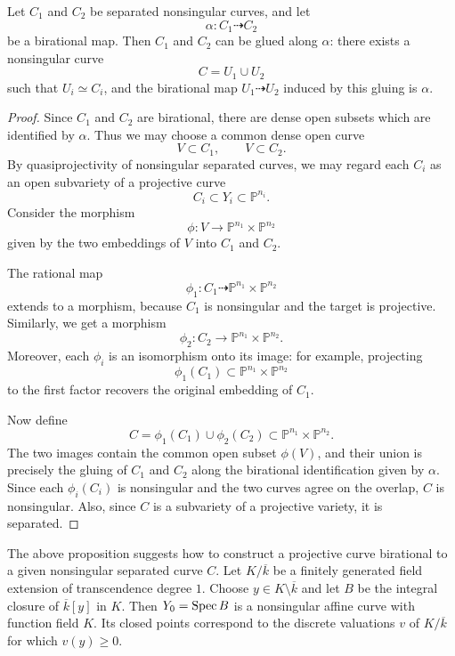 \documentclass[12pt]{article}
\begin{document}
\begin{proposition}
    Let $C_1$ and $C_2$ be separated nonsingular curves, and let
    \[
        \alpha:C_1\dashrightarrow C_2
    \]
    be a birational map. Then $C_1$ and $C_2$ can be glued along $\alpha$: there exists a nonsingular curve
    \[
        C=U_1\cup U_2
    \]
    such that $U_i\simeq C_i$, and the birational map $U_1\dashrightarrow U_2$ induced by this gluing is $\alpha$.
\end{proposition}

\begin{proof}
    Since $C_1$ and $C_2$ are birational, there are dense open subsets which are identified by $\alpha$. Thus we may choose a common dense open curve
    \[
        V\subset C_1,\qquad V\subset C_2.
    \]
    By quasiprojectivity of nonsingular separated curves, we may regard each $C_i$ as an open subvariety of a projective curve
    \[
        C_i\subset Y_i\subset \mathbb P^{n_i}.
    \]
    Consider the morphism
    \[
        \phi:V\to \mathbb P^{n_1}\times \mathbb P^{n_2}
    \]
    given by the two embeddings of $V$ into $C_1$ and $C_2$.

    The rational map
    \[
        \phi_1:C_1\dashrightarrow \mathbb P^{n_1}\times \mathbb P^{n_2}
    \]
    extends to a morphism, because $C_1$ is nonsingular and the target is projective. Similarly, we get a morphism
    \[
        \phi_2:C_2\to \mathbb P^{n_1}\times \mathbb P^{n_2}.
    \]
    Moreover, each $\phi_i$ is an isomorphism onto its image: for example, projecting
    \[
        \phi_1(C_1)\subset \mathbb P^{n_1}\times \mathbb P^{n_2}
    \]
    to the first factor recovers the original embedding of $C_1$.

    Now define
    \[
        C=\phi_1(C_1)\cup \phi_2(C_2)
        \subset \mathbb P^{n_1}\times \mathbb P^{n_2}.
    \]
    The two images contain the common open subset $\phi(V)$, and their union is precisely the gluing of $C_1$ and $C_2$ along the birational identification given by $\alpha$. Since each $\phi_i(C_i)$ is nonsingular and the two curves agree on the overlap, $C$ is nonsingular. Also, since $C$ is a subvariety of a projective variety, it is separated.
\end{proof}

The above proposition suggests how to construct a projective curve birational to a given nonsingular separated curve $C$. Let $K/\overline{k}$ be a finitely generated field extension of transcendence degree $1$. Choose $y\in K\setminus \overline{k}$ and let $B$ be the integral closure of $\overline{k}[y]$ in $K$. Then $Y_0=\operatorname{Spec} B$ is a nonsingular affine curve with function field $K$. Its closed points correspond to the discrete valuations $v$ of $K/\overline{k}$ for which $v(y)\geq 0$.
\end{document}
